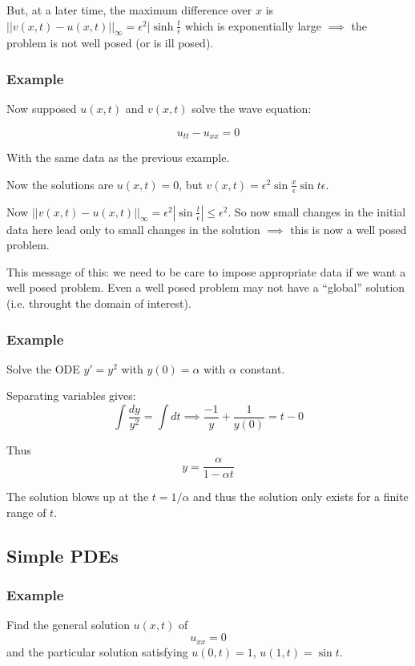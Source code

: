 But, at a later time, the maximum difference over $x$ is $|| v(x, t) - u(x, t) ||_{\infty} = \epsilon^2 | \sinh \frac{t}{\epsilon}$ which is exponentially large $\implies$ the problem is not well posed (or is ill posed).

\subsubsection*{Example}

Now supposed $u(x, t)$ and $v(x,t)$ solve the wave equation:

$$u_{tt} - u_{xx} = 0$$

With the same data as the previous example.

\vspace{\baselineskip}

Now the solutions are $u(x, t) = 0$, but $v(x, t) = \epsilon^2 \sin \frac{x}{\epsilon} \sin {t}{\epsilon}$.

Now $|| v(x, t) - u(x, t) ||_{\infty} = \epsilon^2 | \sin \frac{t}{\epsilon} | \leq \epsilon^2$. So now small changes in the initial data here lead only to small changes in the solution $\implies$ this is now a well posed problem.

This message of this: we need to be care to impose appropriate data if we want a well posed problem. Even a well posed problem may not have a ``global'' solution (i.e. throught the domain of interest).

\subsubsection*{Example}

Solve the ODE $y' = y^2$ with $y(0) = \alpha$ with $\alpha$ constant.

Separating variables gives: $$\int \frac{dy}{y^2} = \int dt \implies \frac{-1}{y} + \frac{1}{y(0)} = t - 0$$

Thus $$y = \frac{\alpha}{1 - \alpha t}$$

The solution blows up at the $ t = 1/\alpha$ and thus the solution only exists for a finite range of $t$.

\subsection{Simple PDEs}

\subsubsection*{Example}

Find the general solution $u(x, t)$ of $$u_{xx} = 0$$ and the particular solution satisfying $u(0, t) = 1$, $u(1, t) = \sin t$.
